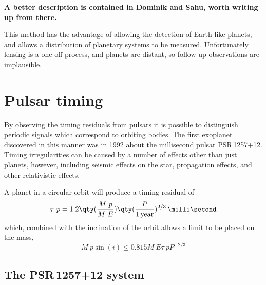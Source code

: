 \textbf{A better description is contained in Dominik and Sahu, worth
  writing up from there.}

This method has the advantage of allowing the detection of Earth-like
planets, and allows a distribution of planetary systems to be
measured. Unfortunately lensing is a one-off process, and planets are
distant, so follow-up observations are implausible.



\section{Pulsar timing}
\label{sec:pulsar-timing}

By observing the timing residuals from pulsars it is possible to
distinguish periodic signals which correspond to orbiting bodies. The
first exoplanet discovered in this manner was in 1992 about the
millisecond pulsar PSR\,1257+12. Timing irregularities can be caused
by a number of effects other than just planets, however, including
seismic effects on the star, propagation effects, and other
relativistic effects.

A planet in a circular orbit will produce a timing residual of
\begin{equation}
  \label{eq:33}
  \tau~p = 1.2 \qty( \frac{M~p}{M~E} ) \qty( \frac{P}{1\,\text{year}})^{2/3}\,\milli\second
\end{equation}
which, combined with the inclination of the orbit allows a limit to be
placed on the mass,
\begin{equation}
  \label{eq:34}
  M~p \sin(i) \le 0.815 M~E \tau~p P^{-2/3}
\end{equation}

\subsection{The PSR\,1257+12 system}
\label{sec:psr-1257+12-system}

